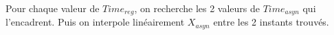 Pour chaque valeur de $Time_{reg}$, on recherche les 2 valeurs
de $Time_{asyn}$ qui l'encadrent.
Puis on interpole lin\'eairement $X_{asyn}$ entre
les 2 instants trouv\'es.

